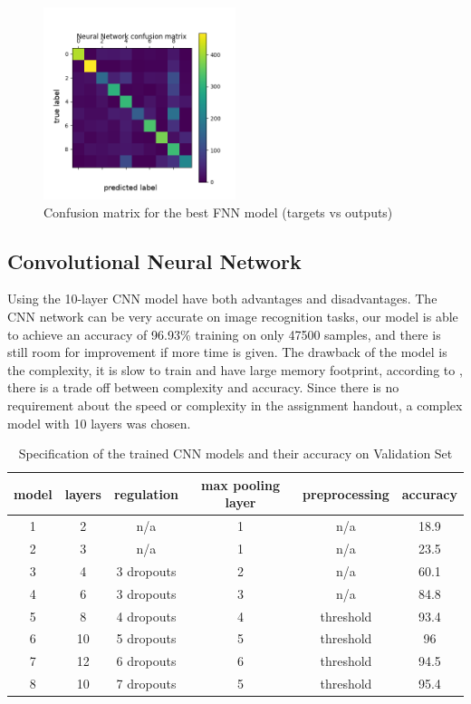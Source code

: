 \documentclass[letterpaper, 10 pt, conference]{ieeeconf}  %
\begin{document}
\begin{figure}[h]
	\begin{center}
			\includegraphics[width=0.5\textwidth]{figures/fnn_conf.png}  %
		\caption{Confusion matrix for the best FNN model (targets vs outputs)}
		\label{fig:fnnconf}
	\end{center}
\end{figure}


\subsection{Convolutional Neural Network}
Using the 10-layer CNN model have both advantages and disadvantages. The CNN network can be very accurate on image recognition tasks, our model is able to achieve an accuracy of 96.93\% training on only 47500 samples, and there is still room for improvement if more time is given. The drawback of the model is the complexity, it is slow to train and have large memory footprint, according to \cite{dhingra2017model}, there is a trade off between complexity and accuracy. Since there is no requirement about the speed or complexity in the assignment handout, a complex model with 10 layers was chosen. 

\begin{table}
	\centering
	\caption{Specification of the trained CNN models and their accuracy on Validation Set}
	\label{tab:}
	\begin{tabular}{|c|c|c|c|c|c|}
		\hline
		model	&layers&	regulation&	max pooling layer&preprocessing&accuracy\\\hline
		1&	2& n/a & 1   &	n/a		&18.9\\\hline	
		2&	3&	n/a		&1  &	n/a		&23.5\\\hline
		3&	4&	3 dropouts&2&	n/a		&60.1\\\hline
		4&	6&	3 dropouts&3&	n/a		& 84.8	\\\hline
		5&	8&	4 dropouts&4&threshold&93.4	\\\hline
		6&	10&	5 dropouts&5&threshold &96\\\hline
		7&	12&	6 dropouts&6&threshold&94.5\\\hline	
		8&	10&	7 dropouts&5&threshold&95.4\\\hline			
	\end{tabular}
\end{table}
\end{document}
